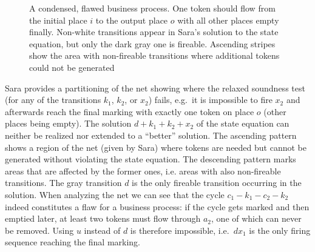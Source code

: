 \documentclass{LMCS}
\begin{document}
\begin{figure}[tb]
\centering
{}
\caption{\label{f.counternet}A condensed, flawed business process. One token should flow
	from the initial place $i$ to the output place $o$ with all other places empty finally.
	Non-white transitions
	appear in Sara's solution to the state equation, but only the dark gray one is fireable.
	Ascending stripes show the area with non-fireable transitions where additional tokens could not be generated}
\end{figure}

Sara provides a partitioning of the net showing where the relaxed soundness test (for any of the
transitions $k_1$, $k_2$, or $x_2$) fails, e.g.\ it is impossible to fire $x_2$ and afterwards reach the
final marking with exactly one token on place $o$ (other places being empty). The solution 
$d+k_1+k_2+x_2$ of the state equation
can neither be realized nor extended to a ``better'' solution.
The ascending pattern shows a region of the net (given by Sara)
where tokens are needed but cannot be generated without violating the state equation.
The descending pattern marks areas that are affected by the former ones, i.e. areas with
also non-fireable transitions. The gray transition $d$ is the only fireable transition occurring
in the solution. When analyzing the net we can see that the cycle $c_1-k_1-c_2-k_2$ indeed
constitutes a flaw for a business process: if the cycle gets marked and then emptied later,
at least two tokens must flow through $a_2$, one of which can never be removed.
Using $u$ instead of $d$ is therefore impossible, i.e.\ $d x_1$ is the only
firing sequence reaching the final marking.
\end{document}
